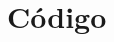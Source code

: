 \documentclass[12pt,a4paper]{book}
\begin{document}
\begin{itemize}





\end{itemize}


\appendix
\chapter{Código}\label{aped.A}
\end{document}
